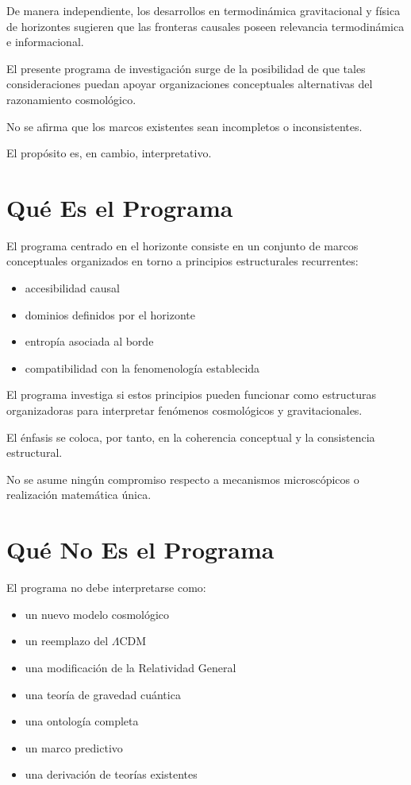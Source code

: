 \documentclass[12pt,a4paper]{article}
\begin{document}
De manera independiente, los desarrollos en termodinámica gravitacional y física de horizontes sugieren que las fronteras causales poseen relevancia termodinámica e informacional.

El presente programa de investigación surge de la posibilidad de que tales consideraciones puedan apoyar organizaciones conceptuales alternativas del razonamiento cosmológico.

No se afirma que los marcos existentes sean incompletos o inconsistentes.

El propósito es, en cambio, interpretativo.

\section{Qué Es el Programa}

El programa centrado en el horizonte consiste en un conjunto de marcos conceptuales organizados en torno a principios estructurales recurrentes:

\begin{itemize}
  \item accesibilidad causal
  \item dominios definidos por el horizonte
  \item entropía asociada al borde
  \item compatibilidad con la fenomenología establecida
\end{itemize}

El programa investiga si estos principios pueden funcionar como estructuras organizadoras para interpretar fenómenos cosmológicos y gravitacionales.

El énfasis se coloca, por tanto, en la coherencia conceptual y la consistencia estructural.

No se asume ningún compromiso respecto a mecanismos microscópicos o realización matemática única.

\section{Qué No Es el Programa}

El programa no debe interpretarse como:

\begin{itemize}
  \item un nuevo modelo cosmológico
  \item un reemplazo del $\Lambda$CDM
  \item una modificación de la Relatividad General
  \item una teoría de gravedad cuántica
  \item una ontología completa
  \item un marco predictivo
  \item una derivación de teorías existentes
\end{itemize}
\end{document}
